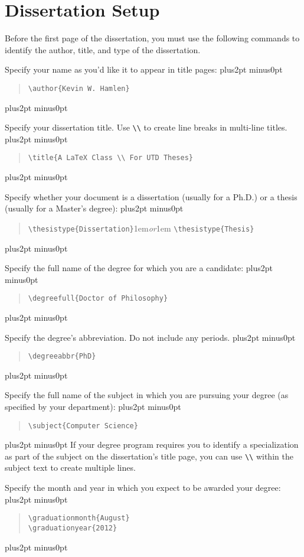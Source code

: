 \documentclass[doublespacing]{utdthesis}
\newenvironment{exampleclasscode}
 {\parindent=1cm\vskip0pt plus2pt minus0pt\begin{verse}}
 {\end{verse}\vskip0pt plus2pt minus0pt}
\begin{document}
\section{Dissertation Setup}
\label{s:setup}

Before the first page of the dissertation, you must use the following commands
to identify the author, title, and type of the dissertation.

Specify your name as you'd like it to appear in title pages:
\begin{exampleclasscode}
\verb|\author{Kevin W. Hamlen}|
\end{exampleclasscode}

Specify your dissertation title.
Use \verb|\\| to create line breaks in multi-line titles.
\begin{exampleclasscode}
\verb|\title{A LaTeX Class \\ For UTD Theses}|
\end{exampleclasscode}

Specify whether your document is a dissertation (usually for a Ph.D.) or a
thesis (usually for a Master's degree):
\begin{exampleclasscode}
\verb|\thesistype{Dissertation}|\kern1em\textit{or}\kern1em
\verb|\thesistype{Thesis}|
\end{exampleclasscode}

Specify the full name of the degree for which you are a candidate:
\begin{exampleclasscode}
\verb|\degreefull{Doctor of Philosophy}|
\end{exampleclasscode}

Specify the degree's abbreviation.
Do not include any periods.
\begin{exampleclasscode}
\verb|\degreeabbr{PhD}|
\end{exampleclasscode}

Specify the full name of the subject in which you are pursuing your degree
(as specified by your department):
\begin{exampleclasscode}
\verb|\subject{Computer Science}|
\end{exampleclasscode}
If your degree program requires you to identify a specialization as part of
the subject on the dissertation's title page, you can use \verb|\\| within
the subject text to create multiple lines.

Specify the month and year in which you expect to be awarded your degree:
\begin{exampleclasscode}
\verb|\graduationmonth{August}| \\
\verb|\graduationyear{2012}|
\end{exampleclasscode}
\end{document}
